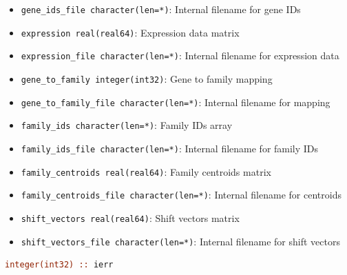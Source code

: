 \begin{enumerate}
\begin{itemize}
\begin{itemize}
                    \item \texttt{gene\_ids\_file character(len=*)}: Internal filename for
                          gene IDs
                          
                    \item \texttt{expression real(real64)}: Expression data matrix
                          
                    \item \texttt{expression\_file character(len=*)}: Internal filename for
                          expression data
                          
                    \item \texttt{gene\_to\_family integer(int32)}: Gene to family mapping
                          
                    \item \texttt{gene\_to\_family\_file character(len=*)}: Internal filename
                          for mapping
                          
                    \item \texttt{family\_ids character(len=*)}: Family IDs array
                          
                    \item \texttt{family\_ids\_file character(len=*)}: Internal filename
                          for family IDs
                          
                    \item \texttt{family\_centroids real(real64)}: Family centroids matrix
                          
                    \item \texttt{family\_centroids\_file character(len=*)}: Internal filename
                          for centroids
                          
                    \item \texttt{shift\_vectors real(real64)}: Shift vectors matrix
                          
                    \item \texttt{shift\_vectors\_file character(len=*)}: Internal filename
                          for shift vectors
                  \end{itemize}
                  \begin{lstlisting}[language=Fortran, caption={Save Complete Data Archive}]
integer(int32) :: ierr


\end{lstlisting}
\end{itemize}
\end{enumerate}
